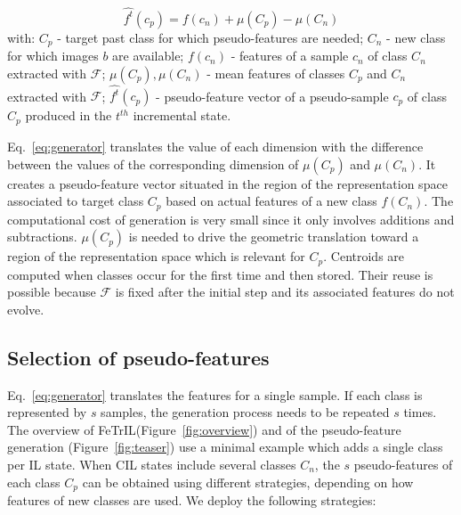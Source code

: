 \documentclass[10pt,twocolumn,letterpaper]{article}
\makeatletter
\newcommand{\ourmodel}{FeTrIL\@\xspace}
\makeatother
\begin{document}
\begin{equation}
    {\hat{f^t}}(c_p) = f(c_n) + \mu(C_p) - \mu(C_n)
\label{eq:generator}
\end{equation}
with: 
$C_p$ - target past class for which pseudo-features are needed; 
$C_n$ - new class for which images $b$ are available;
$f(c_n)$ - features of a sample $c_n$ of class $C_n$ extracted with $\mathcal{F}$;
$\mu(C_p), \mu(C_n)$ - mean features of classes $C_p$ and $C_n$ extracted with $\mathcal{F}$;
${\hat{f^t}}(c_p)$ - pseudo-feature vector of a pseudo-sample $c_p$ of class $C_p$ produced in the $t^{th}$ incremental state.

Eq.~\ref{eq:generator} translates the value of each dimension with the difference between the values of the corresponding dimension of $\mu(C_p)$ and $\mu(C_n)$. 
It creates a pseudo-feature vector situated in the region of the representation space associated to target class $C_p$ based on actual features of a new class $f(C_n)$.
The computational cost of generation is very small since it only involves additions and subtractions. 
$\mu(C_p)$ is needed to drive the geometric translation toward a region of the representation space which is relevant for $C_p$.
Centroids are computed when classes occur for the first time and then stored.
Their reuse is possible because $\mathcal{F}$ is fixed after the initial step and its associated features do not evolve.


\subsection{Selection of pseudo-features}
\label{subsec:selection}
Eq.~\ref{eq:generator} translates the features for a single sample. 
If each class is represented by $s$ samples, the generation process needs to be repeated $s$ times.
The overview of \ourmodel (Figure~\ref{fig:overview}) and of the pseudo-feature generation (Figure~\ref{fig:teaser}) use a minimal example which adds a single class per IL state.
When CIL states include several classes $ C_n$, the $s$ pseudo-features of each class $C_p$ can be obtained using different strategies, depending on how features of new classes are used. 
We deploy the following strategies:
\end{document}
